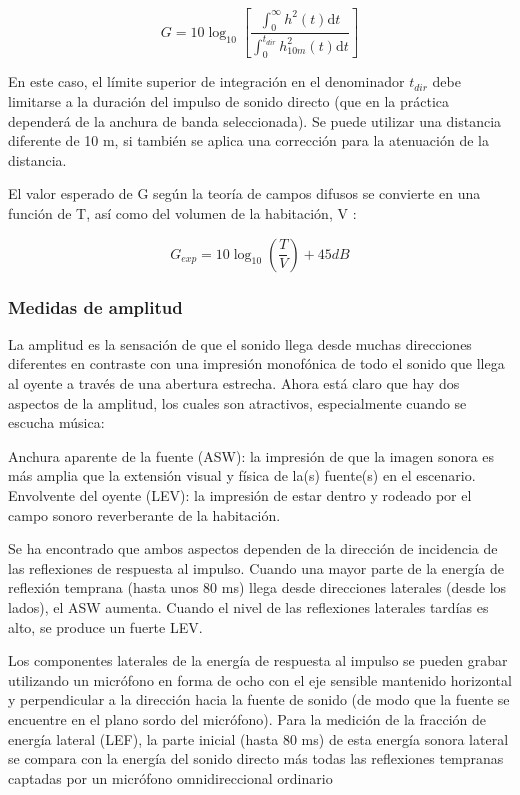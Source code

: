 \begin{equation}
G = 10\log_{10}\left[{\frac{\int_0^{\infty} h^2(t) \mathrm{d}t}{\int_0^{t_{dir}} h^2_{10m}(t) \mathrm{d}t}}\right]
\end{equation}

En este caso, el límite superior de integración en el denominador $t_{dir}$ debe limitarse a la duración del impulso de sonido directo (que en la práctica dependerá de la anchura de banda seleccionada). Se puede utilizar una distancia diferente de 10 m, si también se aplica una corrección para la atenuación de la distancia. 

El valor esperado de G según la teoría de campos difusos se convierte en una función de T, así como del volumen de la habitación, V \cite{Rossing2007}:

\begin{equation}
G_{exp} = 10\log_{10}\left({\frac{T}{V}}\right) + 45 dB
\end{equation}

\subsubsection{Medidas de amplitud} La amplitud es la sensación de que el sonido llega desde muchas direcciones diferentes en contraste con una impresión monofónica de todo el sonido que llega al oyente a través de una abertura estrecha. Ahora está claro que hay dos aspectos de la amplitud, los cuales son atractivos, especialmente cuando se escucha música:

Anchura aparente de la fuente (ASW): la impresión de que la imagen sonora es más amplia que la extensión visual y física de la(s) fuente(s) en el escenario. Envolvente del oyente (LEV): la impresión de estar dentro y rodeado por el campo sonoro reverberante de la habitación.

Se ha encontrado que ambos aspectos dependen de la dirección de incidencia de las 
reflexiones de respuesta al impulso. Cuando una mayor parte de la energía de reflexión temprana (hasta unos 80 ms) llega desde direcciones laterales (desde los lados), el ASW aumenta. Cuando el nivel de las reflexiones laterales tardías es alto, se produce un fuerte LEV.

Los componentes laterales de la energía de respuesta al impulso se pueden grabar utilizando un micrófono en forma de ocho con el eje sensible mantenido horizontal y perpendicular a la dirección hacia la fuente de sonido (de modo que la fuente se encuentre en el plano sordo del micrófono). Para la medición de la fracción de energía lateral (LEF), la parte inicial (hasta 80 ms) de esta energía sonora lateral se compara con la energía del sonido directo más todas las reflexiones tempranas captadas por un micrófono omnidireccional ordinario

